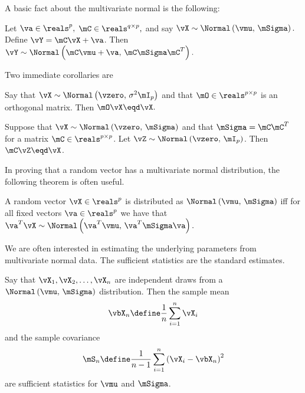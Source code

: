 A basic fact about the multivariate normal is the following:

\begin{proposition}\label{P:scale-shift-normal}
Let 
\(
    \va \in \reals^p,
\)
\(
    \mC \in \reals^{q \times p},
\)
and say
\(
    \vX 
    \sim
    \Normal \left( 
        \vmu, \,
        \mSigma
    \right).
\)
Define $\vY = \mC \vX + \va$.  Then 
\(
    \vY
    \sim
    \Normal \left( 
        \mC \vmu + \va, \,
        \mC \mSigma \mC^T
    \right).
\)
\end{proposition}

\noindent
Two immediate corollaries are

\begin{corollary}\label{C:normal-orthog-invariant}
Say that
\(
    \vX 
    \sim 
    \Normal \left( 
        \vzero, \,
        \sigma^2 \mI_p
    \right)
\)
and that
\(
    \mO \in \reals^{p \times p}
\)
is an orthogonal matrix.  Then
\(
    \mO \vX \eqd \vX.
\)
\end{corollary}

\begin{corollary}
Suppose that
\(
    \vX 
    \sim 
    \Normal \left( 
        \vzero, \,
        \mSigma
    \right)
\)
and that $\mSigma = \mC \mC^T$ for a matrix $\mC \in \reals^{p \times p}$.
Let 
\(
    \vZ
    \sim
    \Normal \left(
        \vzero, \,
        \mI_p
    \right)
\).
Then
\(
    \mC \vZ
    \eqd
    \vX
\).
\end{corollary}    

In proving that a random vector has a multivariate normal distribution,
the following theorem is often useful.

\begin{theorem}\label{T:cramer-wold}
A random vector
\(
    \vX \in \reals^p
\)
is distributed as 
\(
    \Normal \left(
        \vmu, \,
        \mSigma
    \right)
\)
iff for all fixed vectors
\(
    \va \in \reals^p
\)
we have that
\(
    \va^T \vX
    \sim
    \Normal \left(
        \va^T \vmu, \,
        \va^T \mSigma \va
    \right).
\)
\end{theorem}

We are often interested in estimating the underlying parameters from
multivariate normal data.  The sufficient statistics are the standard
estimates.

\begin{proposition}\label{P:normal-sufficient-stats}
Say that
\(
    \vX_1, \vX_2, \ldots, \vX_n
\) 
are independent draws from a
\(
    \Normal \left(
        \vmu, \,
        \mSigma
    \right)
\)
distribution.  Then the sample mean
\begin{equation}\label{E:sample-mean}
    \vbX_n
    \define
    \frac{1}{n}
    \sum_{i=1}^n
        \vX_i
\end{equation}
and the sample covariance
\begin{equation}\label{E:sample-covariance}
    \mS_n
    \define
    \frac{1}{n-1}
    \sum_{i=1}^n
        \left(
            \vX_i - \vbX_n
        \right)^2
\end{equation}
are sufficient statistics for $\vmu$ and $\mSigma$.
\end{proposition}

